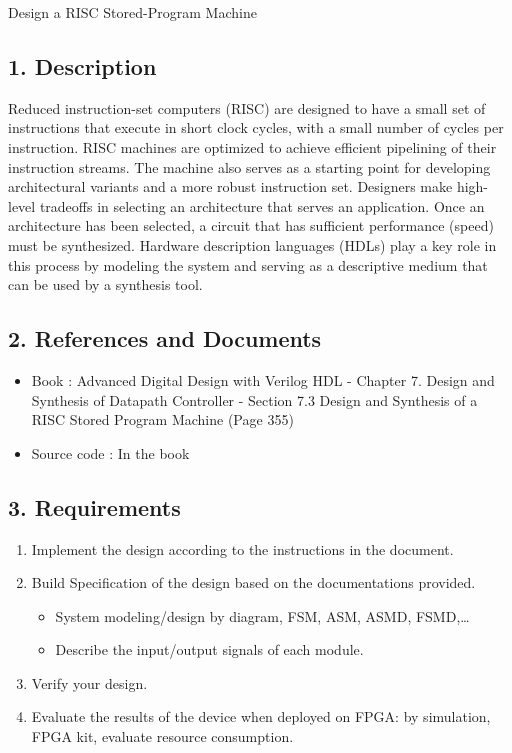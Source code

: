 \documentclass{vhdl-assignment}
\begin{document}
\pagebreak
\begin{project}{Design a RISC Stored-Program Machine}
    \subsection*{1. Description}
    Reduced instruction-set computers (RISC) are designed to have a small set of instructions that execute in short clock cycles, with a small number of cycles per instruction.
    RISC machines are optimized to achieve efficient pipelining of their instruction streams.
    The machine also serves as a starting point for developing architectural variants and a more robust instruction set.
    Designers make high-level tradeoffs in selecting an architecture that serves an application.
    Once an architecture has been selected, a circuit that has sufficient performance (speed) must be synthesized.
    Hardware description languages (HDLs) play a key role in this process by modeling the system and serving as a descriptive medium that can be used by a synthesis tool.
    \subsection*{2. References and Documents}
    \begin{itemize}
        \item Book : Advanced Digital Design with Verilog HDL - Chapter 7. Design and Synthesis of Datapath Controller - Section 7.3 Design and Synthesis of a RISC Stored Program Machine (Page 355)
        \item Source code : In the book 
    \end{itemize}
    \subsection*{3. Requirements}
    \begin{enumerate}
        \item Implement the design according to the instructions in the document.
        \item Build Specification of the design based on the documentations provided.
        \begin{itemize}
            \item System modeling/design by diagram, FSM, ASM, ASMD, FSMD,\dots
            \item Describe the input/output signals of each module.
        \end{itemize}
        \item Verify your design.
        \item Evaluate the results of the device when deployed on FPGA: by simulation, FPGA kit, evaluate resource consumption.
    \end{enumerate}
\end{project}
\end{document}

